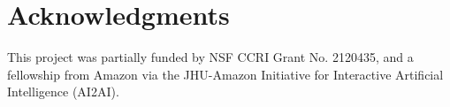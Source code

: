 \documentclass[a4paper]{article}
\begin{document}
\section{Acknowledgments}

This project was partially funded by NSF CCRI Grant No. 2120435, and a fellowship from Amazon via the JHU-Amazon Initiative for Interactive Artificial Intelligence (AI2AI).


\clearpage

\small


\end{document}
